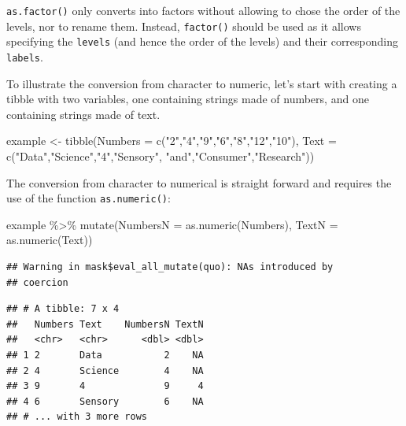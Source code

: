 \documentclass[
]{krantz}
\makeatletter
\newenvironment{Shaded}{\begin{snugshade}}{\end{snugshade}}
\newcommand{\AttributeTok}[1]{\textcolor[rgb]{0.61,0.61,0.61}{#1}}
\newcommand{\FunctionTok}[1]{\textcolor[rgb]{0,0,0}{#1}}
\newcommand{\NormalTok}[1]{#1}
\newcommand{\OtherTok}[1]{\textcolor[rgb]{0.37,0.37,0.37}{#1}}
\newcommand{\SpecialCharTok}[1]{\textcolor[rgb]{0,0,0}{#1}}
\newcommand{\StringTok}[1]{\textcolor[rgb]{0.5,0.5,0.5}{#1}}
\renewenvironment{quote}{\begin{VF}}{\end{VF}}
\newenvironment{kframe}{%
\medskip{}
\setlength{\fboxsep}{.8em}
 \def\at@end@of@kframe{}%
 \ifinner\ifhmode%
  \def\at@end@of@kframe{\end{minipage}}%
  \begin{minipage}{\columnwidth}%
 \fi\fi%
 \def\FrameCommand##1{\hskip\@totalleftmargin \hskip-\fboxsep
 \colorbox{shadecolor}{##1}\hskip-\fboxsep
     \hskip-\linewidth \hskip-\@totalleftmargin \hskip\columnwidth}%
 \MakeFramed {\advance\hsize-\width
   \@totalleftmargin\z@ \linewidth\hsize
   \@setminipage}}%
 {\par\unskip\endMakeFramed%
 \at@end@of@kframe}
\renewenvironment{Shaded}{\begin{kframe}}{\end{kframe}}
\makeatother
\begin{document}
\begin{quote}
\texttt{as.factor()} only converts into factors without allowing to chose the order of the levels, nor to rename them. Instead, \texttt{factor()} should be used as it allows specifying the \texttt{levels} (and hence the order of the levels) and their corresponding \texttt{labels}.
\end{quote}

To illustrate the conversion from character to numeric, let's start with creating a tibble with two variables, one containing strings made of numbers, and one containing strings made of text.

\begin{Shaded}
\begin{Highlighting}[]
\NormalTok{example }\OtherTok{\textless{}{-}} \FunctionTok{tibble}\NormalTok{(}\AttributeTok{Numbers =} \FunctionTok{c}\NormalTok{(}\StringTok{"2"}\NormalTok{,}\StringTok{"4"}\NormalTok{,}\StringTok{"9"}\NormalTok{,}\StringTok{"6"}\NormalTok{,}\StringTok{"8"}\NormalTok{,}\StringTok{"12"}\NormalTok{,}\StringTok{"10"}\NormalTok{),}
                  \AttributeTok{Text =} \FunctionTok{c}\NormalTok{(}\StringTok{"Data"}\NormalTok{,}\StringTok{"Science"}\NormalTok{,}\StringTok{"4"}\NormalTok{,}\StringTok{"Sensory"}\NormalTok{,}
                           \StringTok{"and"}\NormalTok{,}\StringTok{"Consumer"}\NormalTok{,}\StringTok{"Research"}\NormalTok{))}
\end{Highlighting}
\end{Shaded}

The conversion from character to numerical is straight forward and requires the use of the function \texttt{as.numeric()}:

\begin{Shaded}
\begin{Highlighting}[]
\NormalTok{example }\SpecialCharTok{\%\textgreater{}\%} 
  \FunctionTok{mutate}\NormalTok{(}\AttributeTok{NumbersN =} \FunctionTok{as.numeric}\NormalTok{(Numbers), }\AttributeTok{TextN =} \FunctionTok{as.numeric}\NormalTok{(Text))}
\end{Highlighting}
\end{Shaded}

\begin{verbatim}
## Warning in mask$eval_all_mutate(quo): NAs introduced by
## coercion
\end{verbatim}

\begin{verbatim}
## # A tibble: 7 x 4
##   Numbers Text    NumbersN TextN
##   <chr>   <chr>      <dbl> <dbl>
## 1 2       Data           2    NA
## 2 4       Science        4    NA
## 3 9       4              9     4
## 4 6       Sensory        6    NA
## # ... with 3 more rows
\end{verbatim}
\end{document}
